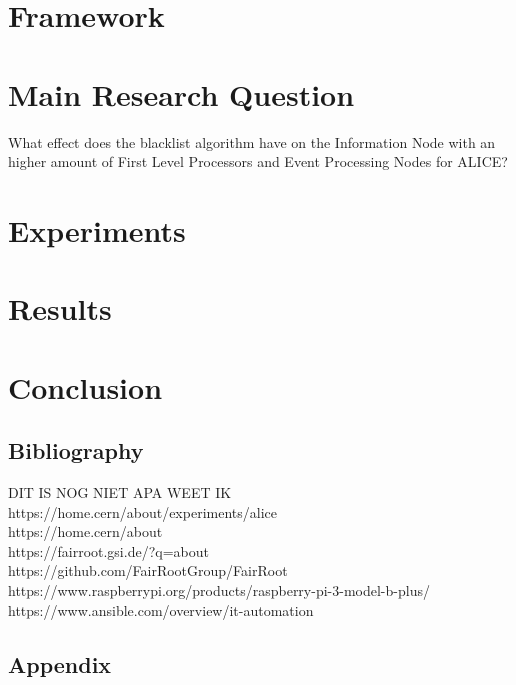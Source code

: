 \documentclass{report}
\begin{document}


\newpage

\chapter{Framework}



\chapter{Main Research Question}
What effect does the blacklist algorithm have on the Information Node with an higher amount of First Level Processors and Event Processing Nodes for ALICE?

\chapter{Experiments}



\chapter{Results}



\chapter{Conclusion}

\section*{Bibliography}
DIT IS NOG NIET APA WEET IK\\
https://home.cern/about/experiments/alice\\
https://home.cern/about\\
https://fairroot.gsi.de/?q=about\\
https://github.com/FairRootGroup/FairRoot\\
https://www.raspberrypi.org/products/raspberry-pi-3-model-b-plus/\\
https://www.ansible.com/overview/it-automation\\


\section{Appendix}


\end{document}
